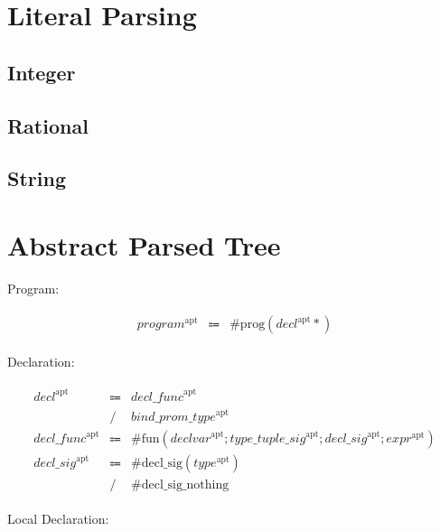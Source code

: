 \section{Literal Parsing}

\subsection{Integer}

\subsection{Rational}

\subsection{String}

\section{Abstract Parsed Tree}

Program:

\begin{align*}
    \begin{array}{rcll}
        \mathit{program}^\mathrm{apt}
        &\Coloneq &\mathrm{\#prog}(\mathit{decl}^\mathrm{apt}*)
    \end{array}
\end{align*}

Declaration:

\begin{align*}
    \begin{array}{rcll}
        \mathit{decl}^\mathrm{apt}
        &\Coloneq &\mathit{decl\_func}^\mathrm{apt} \\
        &\mathrel{/} &\mathit{bind\_prom\_type}^\mathrm{apt} \\
        \mathit{decl\_func}^\mathrm{apt}
        &\Coloneq &\mathrm{\#fun}(\mathit{declvar}^\mathrm{apt}; \mathit{type\_tuple\_sig}^\mathrm{apt}; \mathit{decl\_sig}^\mathrm{apt}; \mathit{expr}^\mathrm{apt}) \\
        \mathit{decl\_sig}^\mathrm{apt}
        &\Coloneq &\mathrm{\#decl\_sig}(\mathit{type}^\mathrm{apt}) \\
        &\mathrel{/} &\mathrm{\#decl\_sig\_nothing}
    \end{array}
\end{align*}

Local Declaration:

